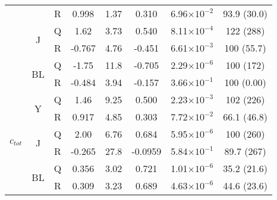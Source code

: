 \begin{subappendices}
\begin{table}[htb!]
\begin{tabular}{|ccc|ccccc|}
        & & R & 0.998 & 1.37 & 0.310 & 6.96$\times 10^{-2}$ & 93.9 (30.0) \\
        \cline{2-8}
        & \multirow{2}{*}{J} & Q & 1.62 & 3.73 & 0.540 & 8.11$\times 10^{-4}$ & 122 (288) \\
        & & R & -0.767 & 4.76 & -0.451 & 6.61$\times 10^{-3}$ & 100 (55.7) \\
        \cline{2-8}
        & \multirow{2}{*}{BL} & Q & -1.75 & 11.8 & -0.705 & 2.29$\times 10^{-6}$ & 100 (172) \\
        & & R & -0.484 & 3.94 & -0.157 & 3.66$\times 10^{-1}$ & 100 (0.00) \\
        \hline
        \multirow{6}{*}{$c_{tot}$} & \multirow{2}{*}{Y} & Q & 1.46 & 9.25 & 0.500 & 2.23$\times 10^{-3}$ & 102 (226) \\
        & & R & 0.917 & 4.85 & 0.303 & 7.72$\times 10^{-2}$ & 66.1 (46.8) \\
        \cline{2-8}
        & \multirow{2}{*}{J} & Q & 2.00 & 6.76 & 0.684 & 5.95$\times 10^{-6}$ & 100 (260) \\
        & & R & -0.265 & 27.8 & -0.0959 & 5.84$\times 10^{-1}$ & 89.7 (267) \\
        \cline{2-8}
        & \multirow{2}{*}{BL} & Q & 0.356 & 3.02 & 0.721 & 1.01$\times 10^{-6}$ & 35.2 (21.6) \\
        & & R & 0.309 & 3.23 & 0.689 & 4.63$\times 10^{-6}$ & 44.6 (23.6) \\
        \hline
    \end{tabular}
    \label{tb:phantomparamsfull}
\end{table}
\FloatBarrier
\end{subappendices}
